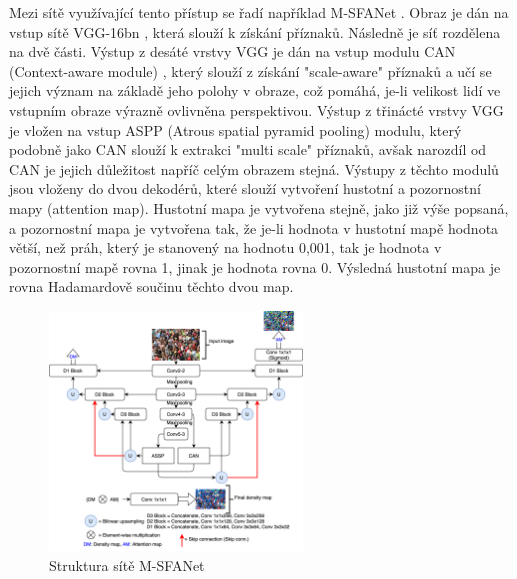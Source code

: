 \begin{description}
Mezi sítě využívající tento přístup se řadí například M-SFANet \cite{MSFANet_for_crowd_counting}.
Obraz je dán na vstup sítě VGG-16bn \cite{VGG}, která slouží k získání příznaků.
Následně je síť rozdělena na dvě části.
Výstup z desáté vrstvy VGG je dán na vstup modulu CAN (Context-aware module) \cite{CAN_1, CAN_2}, který slouží z získání "scale-aware" příznaků a učí se jejich význam na základě jeho polohy v obraze, což pomáhá, je-li velikost lidí ve vstupním obraze výrazně ovlivněna perspektivou.
Výstup z třinácté vrstvy VGG je vložen na vstup ASPP \cite{ASPP} (Atrous spatial pyramid pooling) modulu, který podobně jako CAN slouží k extrakci "multi scale" příznaků, avšak narozdíl od CAN je jejich důležitost napříč celým obrazem stejná.
Výstupy z těchto modulů jsou vloženy do dvou dekodérů, které slouží vytvoření hustotní a pozornostní mapy (attention map).
Hustotní mapa je vytvořena stejně, jako již výše popsaná, a pozornostní mapa je vytvořena tak, že je-li hodnota v hustotní mapě hodnota větší, než práh, který je stanovený na hodnotu 0,001, tak je hodnota v pozornostní mapě rovna 1, jinak je hodnota rovna 0.
Výsledná hustotní mapa je rovna Hadamardově součinu těchto dvou map.

\begin{figure}[h!]
	\centering
	\includegraphics[width=0.6\textwidth]{Figures/history/MSFANet.png}
	\caption{Struktura sítě M-SFANet \cite{MSFANet_for_crowd_counting}}
	\label{fig:M-SFANet}
\end{figure}

\end{description}







\endinput